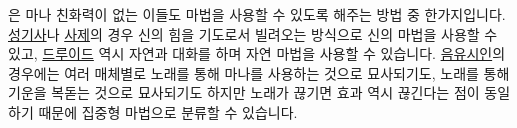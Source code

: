\documentclass{report}
\begin{document}
	은 마나 친화력이 없는 이들도 마법을 사용할 수 있도록 해주는 방법 중 한가지입니다. \hyperlink{class:paladin}{성기사}나 \hyperlink{class:cleric}{사제}의 경우 신의 힘을 기도로서 빌려오는 방식으로 신의 마법을 사용할 수 있고, \hyperlink{class:druid}{드루이드} 역시 자연과 대화를 하며 자연 마법을 사용할 수 있습니다. \hyperlink{class:bard}{음유시인}의 경우에는 여러 매체별로 노래를 통해 마나를 사용하는 것으로 묘사되기도, 노래를 통해 기운을 복돋는 것으로 묘사되기도 하지만 노래가 끊기면 효과 역시 끊긴다는 점이 동일하기 때문에 집중형 마법으로 분류할 수 있습니다.
\end{document}
